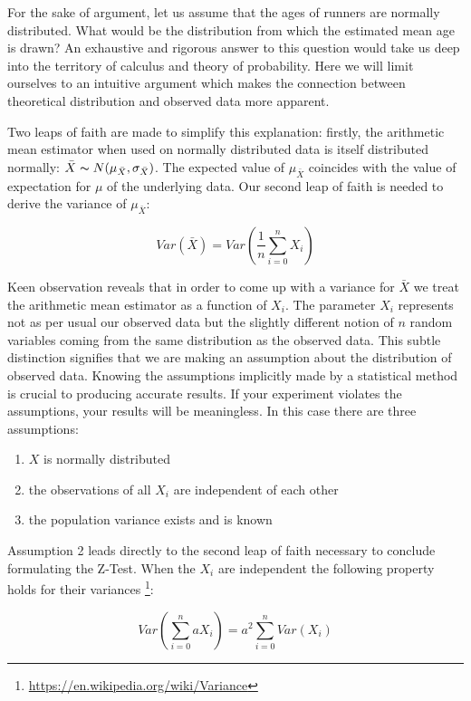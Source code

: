 \documentclass{tufte-book} %
\begin{document}
For the sake of argument, let us assume that the ages of runners are normally distributed. What would be the distribution from which the estimated mean age is drawn? An exhaustive and rigorous answer to this question would take us deep into the territory of calculus and theory of probability. Here we will limit ourselves to an intuitive argument which makes the connection between theoretical distribution and observed data more apparent.

Two leaps of faith are made to simplify this explanation: firstly, the arithmetic mean estimator when used on normally distributed data is itself distributed normally: $\bar{X} \thicksim N(\mu_{\bar{X}}, \sigma_{\bar{X}})$. The expected value of $\mu_{\bar{X}}$ coincides with the value of expectation for $\mu$ of the underlying data. Our second leap of faith is needed to derive the variance of $\mu_{\bar{X}}$:

\begin{equation}
Var(\bar{X}) = Var(\frac{1}{n}\sum_{i=0}^n X_i)
\label{formula:mean-variance}
\end{equation}

Keen observation reveals that in order to come up with a variance for $\bar{X}$ we treat the arithmetic mean estimator as a function of $X_i$. The parameter $X_i$ represents not as per usual our observed data but the slightly different notion of $n$ random variables coming from the same distribution as the observed data. This subtle distinction signifies that we are making an assumption about the distribution of observed data. Knowing the assumptions implicitly made by a statistical method is crucial to producing accurate results. If your experiment violates the assumptions, your results will be meaningless. In this case there are three assumptions:

\begin{enumerate}
	\item $X$ is normally distributed
	\item the observations of all $X_i$ are independent of each other
	\item the population variance exists and is known
\end{enumerate}

Assumption 2 leads directly to the second leap of faith necessary to conclude formulating the \hbox{Z-Test}. When the $X_i$ are independent the following property holds for their variances  \footnote{\url{https://en.wikipedia.org/wiki/Variance}}:

\begin{equation}
Var(\sum_{i=0}^n a X_i) = a^2 \sum_{i = 0}^n Var(X_i)
\label{formula:variance-property}
\end{equation}
\end{document}
